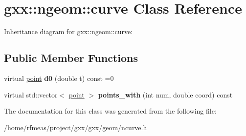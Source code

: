 \hypertarget{classgxx_1_1ngeom_1_1curve}{}\section{gxx\+:\+:ngeom\+:\+:curve Class Reference}
\label{classgxx_1_1ngeom_1_1curve}


Inheritance diagram for gxx\+:\+:ngeom\+:\+:curve\+:
\subsection*{Public Member Functions}
\begin{DoxyCompactItemize}
\item 
virtual \hyperlink{classgxx_1_1ngeom_1_1point}{point} {\bfseries d0} (double t) const =0\hypertarget{classgxx_1_1ngeom_1_1curve_a0fc5baa675a79abdb0218338b2373719}{}\label{classgxx_1_1ngeom_1_1curve_a0fc5baa675a79abdb0218338b2373719}

\item 
virtual std\+::vector$<$ \hyperlink{classgxx_1_1ngeom_1_1point}{point} $>$ {\bfseries points\+\_\+with} (int num, double coord) const \hypertarget{classgxx_1_1ngeom_1_1curve_a9da6484cf7859a66753107e3d231abf4}{}\label{classgxx_1_1ngeom_1_1curve_a9da6484cf7859a66753107e3d231abf4}

\end{DoxyCompactItemize}


The documentation for this class was generated from the following file\+:\begin{DoxyCompactItemize}
\item 
/home/rfmeas/project/gxx/gxx/geom/ncurve.\+h\end{DoxyCompactItemize}

